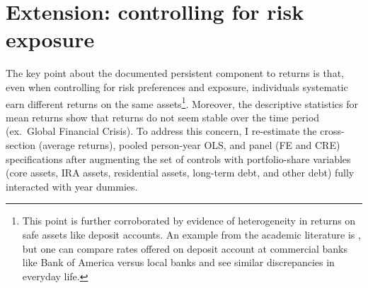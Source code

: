\onlyinsubfile{\setcounter{section}{4}}
\section{Extension: controlling for risk exposure}
\label{sec:exts}

\providecommand{\ChapterTableNoteText}[1]{\parbox[t]{0.94\textwidth}{#1}}
\providecommand{\InputStataRegTable}[4]{%
\begin{table}[htbp]
\centering
\caption{#1}%
\label{#2}%
\begin{threeparttable}
\small
\resizebox{\textwidth}{!}{%
%
}%
\begin{tablenotes}[flushleft]
\footnotesize
\item \ChapterTableNoteText{#4}%
\end{tablenotes}
\end{threeparttable}
\end{table}%
}
\providecommand{\InputStataRegTableCompact}[4]{%
\begin{table}[htbp]
\centering
\caption{#1}%
\label{#2}%
\begin{threeparttable}
\begingroup
\footnotesize
\setlength{\tabcolsep}{4pt}%
\renewcommand{\arraystretch}{0.94}%
\resizebox{\textwidth}{!}{%
%
}%
\endgroup
\begin{tablenotes}[flushleft]
\footnotesize
\item \ChapterTableNoteText{#4}%
\end{tablenotes}
\end{threeparttable}
\end{table}%
}



\par The key point about the documented persistent component to returns is that, even when controlling for risk preferences and exposure, individuals systematic earn different returns on the same assets\footnote{This point is further corroborated by evidence of heterogeneity in returns on safe assets like deposit accounts. An example from the academic literature is \cite{Deuflhard14}, but one can compare rates offered on deposit account at commercial banks like Bank of America versus local banks and see similar discrepancies in everyday life.}. Moreover, the descriptive statistics for mean returns show that returns do not seem stable over the time period (ex.\ Global Financial Crisis). To address this concern, I re-estimate the cross-section (average returns), pooled person-year OLS, and panel (FE and CRE) specifications after augmenting the set of controls with portfolio-share variables (core assets, IRA assets, residential assets, long-term debt, and other debt) fully interacted with year dummies. 

